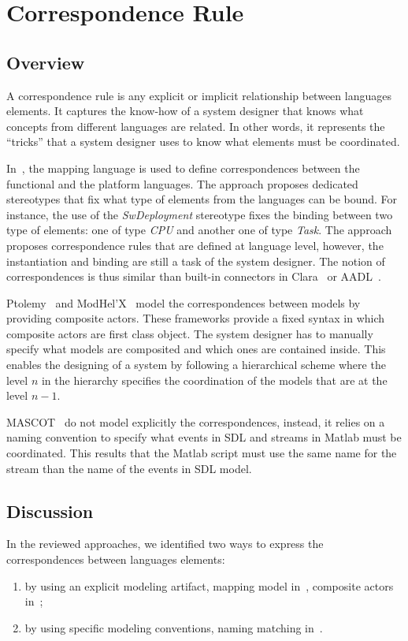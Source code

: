 \section{Correspondence Rule}
	\subsection{Overview}
A correspondence rule is any explicit or implicit relationship between languages elements. It captures the know-how of a system designer that knows what concepts from different languages are related. In other words, it represents the ``tricks'' that a system designer uses to know what elements must be coordinated.%

In~\cite{dinatale}, the mapping language is used to define correspondences between the functional and the platform languages. The approach proposes dedicated stereotypes that fix what type of elements from the languages can be bound. For instance, the use of the \emph{SwDeployment} stereotype fixes the binding between two type of elements: one of type \emph{CPU} and another one of type \emph{Task}. The approach proposes correspondence rules that are defined at language level, however, the instantiation and binding are still a task of the system designer. The notion of correspondences is thus similar than built-in connectors in Clara~\cite{clarabib} or AADL~\cite{aadlbib}. 
		
Ptolemy~\cite{ptoleframebib} and ModHel'X~\cite{modhelxbib} model the correspondences between models by providing composite actors. These frameworks provide a fixed syntax in which composite actors are first class object. The system designer has to manually specify what models are composited and which ones are contained inside. This enables the designing of a system by following a hierarchical scheme where the level $n$ in the hierarchy specifies the coordination of the models that are at the level $n-1$.

MASCOT~\cite{mascotbib} do not model explicitly the correspondences, instead, it relies on a naming convention to specify what events in SDL and streams in Matlab must be coordinated. This results that the Matlab script must use the same name for the stream than the name of the events in SDL model.  

\subsection{Discussion}
In the reviewed approaches, we identified two ways to express the correspondences between languages elements:
\begin{enumerate}
 \item by using an explicit modeling artifact, \eg mapping model in~\cite{dinatale}, composite actors in~\cite{modhelxbib, ptoleframebib}; 	
  \item by using specific modeling conventions, \eg naming matching in~\cite{mascotbib}.
\end{enumerate}
				
